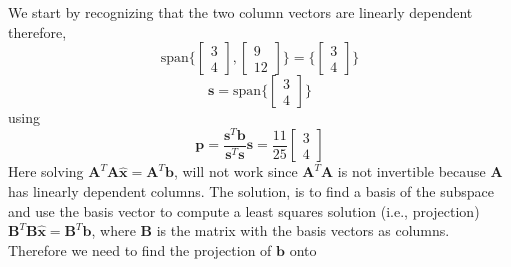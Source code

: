 \begin{mdframed}[style=MyFrame]
    We start by recognizing that the two column vectors are linearly
    dependent therefore,
    \begin{equation}
        \text{span}
        \Bigg\{
            \begin{bmatrix}
                3   \\
                4
            \end{bmatrix}
            ,
            \begin{bmatrix}
                9   \\
                12
            \end{bmatrix}
            \Bigg\}
        =
        \Bigg\{
            \begin{bmatrix}
                3   \\
                4
            \end{bmatrix}
            \Bigg\}
    \end{equation}         
    \begin{equation}
        \mathbf{s}
        =
        \text{span}
        \Bigg\{
            \begin{bmatrix}
                3   \\
                4
            \end{bmatrix}
            \Bigg\}
    \end{equation}
    using
    \begin{equation}
        \mathbf{p}  = 
                    \frac{\mathbf{s}^{T}\mathbf{b}}
                            {\mathbf{s}^{T}\mathbf{s}}
                            \mathbf{s}
                    =
                    \frac{11}{25}
                    \begin{bmatrix}
                        3   \\
                        4
                    \end{bmatrix}
    \end{equation}
    Here solving 
    $\mathbf{A}^{T}\mathbf{A}\widehat{\mathbf{x}} =
    \mathbf{A}^{T}\mathbf{b}$, will not work since 
    $\mathbf{A}^{T}\mathbf{A}$ is not invertible because $\mathbf{A}$ has
    linearly dependent columns. The solution, is to find a basis of the
    subspace and use the basis vector to compute a least squares solution
    (i.e., projection) $\mathbf{B}^T\mathbf{B}
    \widehat{\mathbf{x}}=\mathbf{B}^{T}\mathbf{b}$, where $\mathbf{B}$ is
    the matrix with the basis vectors as columns.  Therefore we need to
    find the projection of $\mathbf{b}$ onto 


\end{mdframed}


        
    
    
